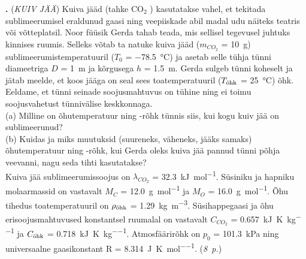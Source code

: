 \documentclass[11pt,a5paper]{article}
\newcommand{\numb}[1]{\vspace{5pt}\textbf{\large #1}}
\newcommand{\nimi}[1]{(\textsl{\small #1})}
\newcommand{\punktid}[1]{(\emph{#1~p.})}
\newcounter{ylesanne}
\newcommand{\yl}[1]{\addtocounter{ylesanne}{1}\numb{\theylesanne.} \nimi{#1} \newblock{}}
\newcommand{\autor}[1]{}%
\begin{document}
\yl{KUIV JÄÄ}
Kuiva jääd (tahke CO\(_{2}\) ) kasutatakse vahel, et tekitada sublimeerumisel eraldunud gaasi ning veepiiskade abil madal udu näiteks teatris või võtteplatsil. Noor füüsik Gerda tahab teada, mis sellisel tegevusel juhtuks kinnises ruumis. Selleks võtab ta natuke kuiva jääd (\(m_{CO_2}\) = \SI{10}{\gram}) sublimeerumistemperatuuril (\(T_{0}\) = \SI{-78,5}{\degreeCelsius}) ja asetab selle tühja tünni diameetriga \(D\) = \SI{1}{\meter} ja kõrgusega \(h\) = \SI{1,5}{\metre}. Gerda sulgeb tünni koheselt ja jätab meelde, et koos jääga on seal sees toatemperatuuril (\(T_{\textup{õhk}}\) = \SI{25}{\degreeCelsius}) õhk. Eeldame, et tünni seinade soojusmahtuvus on tühine ning ei toimu soojusvahetust tünnivälise keskkonnaga.
\\(a) Milline on õhutemperatuur ning -rõhk tünnis siis, kui kogu kuiv jää on sublimeerunud?
\\(b) Kuidas ja miks muutuksid (suureneks, väheneks, jääks samaks) õhutemperatuur ning -rõhk, kui Gerda oleks kuiva jää pannud tünni põhja veevanni, nagu seda tihti kasutatakse?\\
Kuiva jää sublimeerumissoojus on \(\lambda_{CO_2}\) = \SI{32,3}{\kilo\joule\per\mole}. Süsiniku ja hapniku molaarmassid on vastavalt \(M_C\) = \SI{12,0}{\gram\per\mole} ja \(M_O\) = \SI{16,0}{\gram\per\mole}. Õhu tihedus toatemperatuuril on \(\rho_{\textup{õhk}}\) = \SI{1,29}{\kilo\gram\per\metre\cubed}. Süsihappegaasi ja õhu erisoojusmahtuvused konstantsel ruumalal on vastavalt \(C_{CO_{2}}\) = \SI{0,657}{\kilo\joule\per\kelvin\per\kilo\gram} ja \(C_{\textup{õhk}}\) = \SI{0,718}{\kilo\joule\per\kelvin\per\kilo\gram}. Atmosfäärirõhk on \(p_{0}\) = \SI{101,3}{\kilo\pascal} ning universaalne gaasikonstant R = \SI{8,314}{\joule\per\kelvin\per\mole}.
\punktid{8} \autor{Uku Andreas Reigo}
\end{document}
